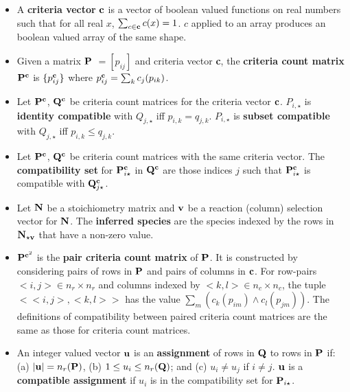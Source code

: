\documentclass{article}
\newcommand{\mat}[1]{${\bf #1}$} %
\newcommand{\cmat}[1]{${\bf #1}^{\bf c}$} %
\newcommand{\ctwomat}[1]{${\bf #1}^{{\bf c}^2}$} %
\newcommand{\crow}[2]{${\bf #1}^{\bf c}_{#2 \star}$}  %
\begin{document}
\begin{itemize}
    \item A {\bf criteria vector} ${\bf c}$ is a vector of boolean valued functions on real numbers
    such that for all real $x$,
$\sum_{c \in {\bf c}} c(x) = 1$. $c$ applied to an array produces an boolean valued array of the same shape.

    \item Given a matrix \mat{P} $= \left[ p_{ij} \right]$ and criteria vector {\bf c}, the {\bf criteria count matrix} \cmat{P} is
    $\{ p^{\bf c}_{ij} \}$ where $p^{\bf c}_{ij} = \sum_k c_j (p_{ik})$.
    
    \item
    Let \cmat{P}, \cmat{Q} be criteria count matrices for the criteria vector \mat{c}. 
    $P_{i, \star}$ is {\bf identity compatible } with $Q_{j, \star}$ iff $p_{i, k} = q_{j, k}$.
    $P_{i, \star}$ is {\bf subset compatible} with $Q_{j, \star}$ iff $p_{i, k} \leq q_{j, k}$.

    \item Let \cmat{P}, \cmat{Q} be criteria count matrices with the same criteria vector. The {\bf compatibility set} for \crow{P}{i} in \cmat{Q}
    are those indices $j$ such that  \crow{P}{i} is compatible with \crow{Q}{j}.
    
    \item Let ${\bf N}$ be a stoichiometry matrix and ${\bf v}$ be a reaction (column) selection vector for ${\bf N}$.
    The {\bf inferred species} are the species indexed by the
    rows in ${\bf N_{\star {\bf v}}}$ that have a non-zero value.

    \item \ctwomat{P} is the {\bf pair criteria count matrix} of \mat{P}. It is constructed by considering pairs of rows in \mat{P} and pairs of columns in \mat{c}. For row-pairs $<i,j> \in n_r \times n_r$ and columns indexed by $<k, l> \in n_c \times n_c$, the tuple $<<i,j>, <k,l>>$ has the value  $\sum_m \left( c_k ( p_{im}) \land c_l ( p_{j m} ) \right)$. The definitions of compatibility between paired criteria count matrices are the same as those for criteria count matrices.

     \item An integer valued vector ${\bf u}$ is an {\bf assignment} of rows in \mat{Q} to rows in \mat{P} if: (a) $|{\bf u}| = n_r({\bf P})$, (b) $1 \leq u_i \leq n_r({\bf Q})$; and (c) $u_i \neq u_j$ if $i \neq j$. ${\bf u}$ is a {\bf compatible assignment} if $u_i$ is in the compatibility set for
     ${\bf P}_{i \star}$.

\end{itemize}
\end{document}
